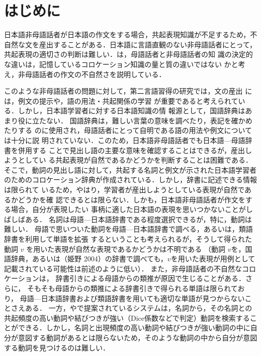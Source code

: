 \documentclass[japanese]{jnlp_1.4}
\begin{document}
\maketitle


\section{はじめに}

日本語非母語話者が日本語の作文をする場合，共起表現知識が不足するため，不
自然な文を産出することがある．日本語に言語直観のない非母語話者にとって，
共起表現の適切さの判断は難しい．\cite{杉浦}は，母語話者と非母語話者の知
識の決定的な違いは，記憶しているコロケーション知識の量と質の違いではない
かと考え，非母語話者の作文の不自然さを説明している．

このような非母語話者の問題に対して，第二言語習得の研究では，文の産出
には，例文の提示\cite{Summers}や，語の用法・共起関係の学習\cite{Granger} 
が重要であると考えられている．しかし，日本語学習者に対する日本語知識の情
報源として，国語辞典はあまり役に立たない．
国語辞典は，難しい言葉の意味を調べたり，表記を確かめたりする
のに使用され，母語話者にとって自明である語の用法や例文については十分に説
明されていない．このため，日本語非母語話者でも日本語—母語辞書を併用する
ことで見出し語の主要な意味を確認することはできるが，産出しようとしてい
る共起表現が自然であるかどうかを判断することは困難である．
そこで，動詞の見出し語に対して，共起する名詞と例文が示された日本語学習者のためのコロケーション辞典が作成されている\cite{姫野}．しかし，辞書に記述できる情報は限られて
いるため，やはり，学習者が産出しようとしている表現が自然であるかどうかを確
認できるとは限らない．しかも，日本語非母語話者が作文をする場合，自分が表現したい
事柄に適した日本語の表現を思いつかないことがしばしばある．
名詞は母語—日本語辞書である程度選択できるが，特に，動詞は難しい．
母語で思いついた動詞を母語—日本語辞書で調べる，あるいは，類語辞書を利用して単語を拡張
するということも考えられるが，そうして得られた動詞 $v$
を用いた表現が自然な表現であるかどうかは不明である
（動詞 $v$を，国語辞典，あるいは（姫野 2004）の辞書で調べても，$v$を用いた表現が用例として記載されている可能性は前述のように低い）．
また，非母語話者の不自然なコロケーションは，
辞書引きによる母語からの類推が原因で生じることがある\cite{滝沢}．さらに，
そもそも母語からの類推による辞書引きで得られる単語は限られており，
母語—日本語辞書および類語辞書を用いても適切な単語が見つからないことさえある．
一方，\cite{Nishina}や\cite{Kilgariff}で提案されているシステムは，名詞から，その名詞との共起頻度の高い動詞や結びつきが強い（Dice係数などで判定）動詞を検索することができる．しかし，名詞と出現頻度の高い動詞や結びつきが強い動詞の中に自分が意図する動詞があるとは限らないため，そのような動詞の中から自分が意図する動詞を見つけるのは難しい．
\end{document}
